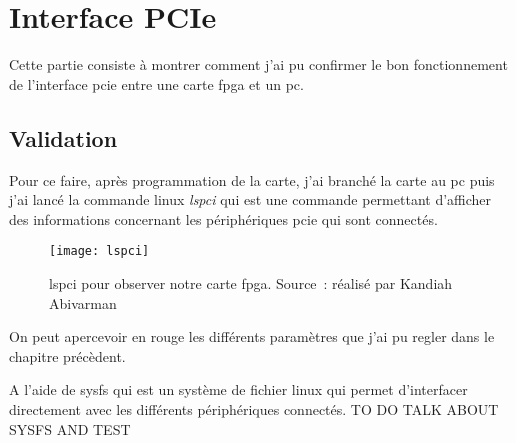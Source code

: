 \newpage

\section{Interface PCIe}

Cette partie consiste à montrer comment j'ai pu confirmer le bon fonctionnement de l'interface \gls{pcie} entre une carte \gls{fpga} et un \gls{pc}.

\subsection{Validation}

Pour ce faire, après programmation de la carte, j'ai branché la carte au \gls{pc} puis j'ai lancé la commande linux \textit{lspci} qui est une commande permettant d'afficher des informations
concernant les périphériques \gls{pcie} qui sont connectés.

\begin{figure}[tbph!]
	\centering
	\texttt{[image: lspci]}
	\caption[lspci pour observer notre carte FPGA]{lspci pour observer notre carte fpga. Source : réalisé par Kandiah Abivarman}
	\label{fig:lspci}
\end{figure}

On peut apercevoir en rouge les différents paramètres que j'ai pu regler dans le chapitre précèdent.

A l'aide de sysfs qui est un système de fichier linux qui permet d'interfacer directement avec les différents périphériques connectés.
TO DO TALK ABOUT SYSFS AND TEST